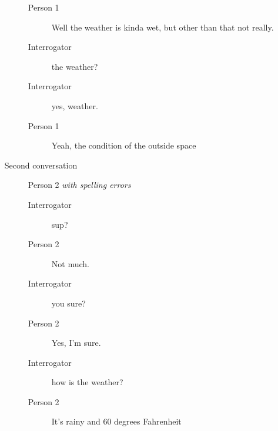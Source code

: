 \begin{itemize}
\begin{description}
\begin{description}
               \item [Person 1] Well the weather is kinda wet, but other than that not really.
               \item [Interrogator] the weather?
               \item [Interrogator] yes, weather.
               \item [Person 1] Yeah, the condition of the outside space
            \end{description}
         \item [Second conversation] Person 2 \textit{with spelling errors}
            \begin{description}
               \item [Interrogator] sup?
               \item [Person 2] Not much.
               \item [Interrogator] you sure?
               \item [Person 2] Yes, I’m sure.
               \item [Interrogator] how is the weather?
               \item [Person 2] It's rainy and 60 degrees Fahrenheit
            \end{description}
      \end{description}


\end{itemize}
